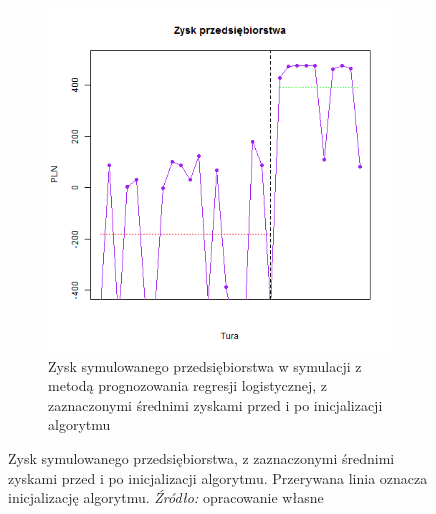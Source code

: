\documentclass[polish, twoside, 12pt, a4paper]{article}
\theoremstyle{definition}
\theoremstyle{plain}
\theoremstyle{remark}
\begin{document}
\begin{figure}[hbt]
\begin{subfigure}[t]{0.45\textwidth}
    \includegraphics[width=\textwidth]{pictures/zysk_km.png}
    \caption{Zysk symulowanego przedsiębiorstwa w symulacji z metodą prognozowania regresji logistycznej, z zaznaczonymi średnimi zyskami przed i po inicjalizacji algorytmu}
    \label{fig:zysk}
  \end{subfigure}
  
  \captionsetup{margin=10pt,font=small,labelfont=bf,width=.8\textwidth}

  \caption[Zysk symulowanego przedsiębiorstwa]{Zysk symulowanego przedsiębiorstwa, z zaznaczonymi średnimi zyskami przed i po inicjalizacji algorytmu. Przerywana linia oznacza inicjalizację algorytmu. \textit{Źródło:} opracowanie własne}\label{fig:wynikifin}
\end{figure}


\appendix

\clearpage



\clearpage
{}
\listoftables

\clearpage
{}
\listoffigures
\end{document}
